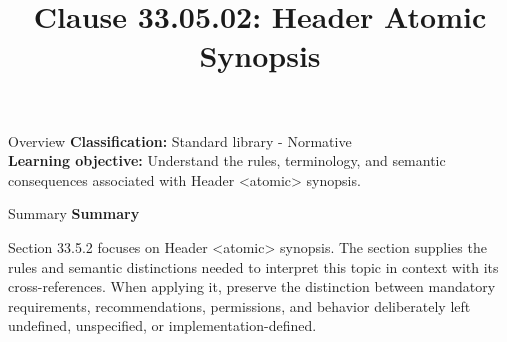 \documentclass[10pt,letterpaper]{article}
\title{Clause 33.05.02: Header Atomic Synopsis}
\author{}
\date{}
\begin{document}
\maketitle
\begin{CornellOverviewBox}{Overview}
\textbf{Classification:} Standard library - Normative\\[2pt]
\textbf{Learning objective:} Understand the rules, terminology, and semantic consequences associated with Header <atomic> synopsis.
\end{CornellOverviewBox}\begin{CornellSummaryBox}{Summary}
{\sffamily\bfseries\color{Accent} Summary}\par\vspace{3pt}Section 33.5.2 focuses on Header <atomic> synopsis. The section supplies the rules and semantic distinctions needed to interpret this topic in context with its cross-references. When applying it, preserve the distinction between mandatory requirements, recommendations, permissions, and behavior deliberately left undefined, unspecified, or implementation-defined.
\end{CornellSummaryBox}
\end{document}
